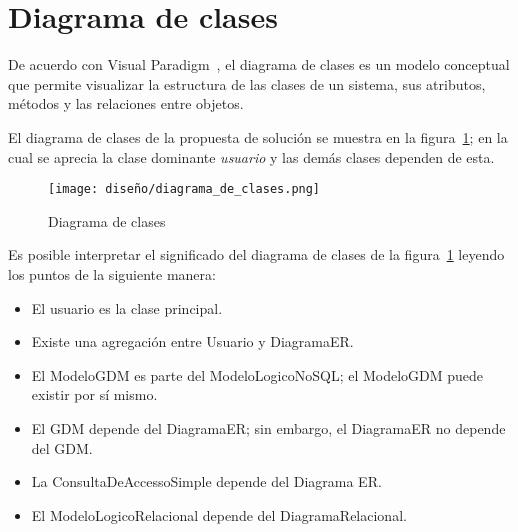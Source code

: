 \section{Diagrama de clases}

De acuerdo con Visual Paradigm~\cite{visual_paradigm_visual_2020}, el diagrama de clases es un modelo conceptual que permite visualizar la estructura de las clases de un sistema, sus atributos, métodos y las relaciones entre objetos.


El diagrama de clases de la propuesta de solución se muestra en la figura~\ref{img:classes_diagram}; en la cual se aprecia la clase dominante \textit{usuario} y las demás clases dependen de esta.


\begin{figure}[H]
  \centering
  \texttt{[image: diseño/diagrama\_de\_clases.png]}
  \caption{Diagrama de clases}
  \label{img:classes_diagram}
\end{figure}

Es posible interpretar el significado del diagrama de clases de la figura~\ref{img:classes_diagram} leyendo los puntos de la siguiente manera:

\begin{itemize}
  \item El usuario es la clase principal.
  \item Existe una agregación entre Usuario y DiagramaER.
  \item El ModeloGDM es parte del ModeloLogicoNoSQL; el ModeloGDM puede existir por sí mismo.
  \item El GDM depende del DiagramaER; sin embargo, el DiagramaER no depende del GDM.
  \item La ConsultaDeAccessoSimple depende del Diagrama ER.
  \item El ModeloLogicoRelacional depende del DiagramaRelacional.
\end{itemize}

